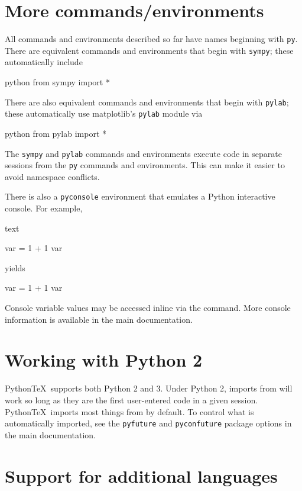 \documentclass[twocolumn]{article}
\newcommand{\pytex}{Python\TeX}
\begin{document}
{\section*{More commands/environments}

All commands and environments described so far have names beginning with \texttt{py}.  There are equivalent commands and environments that begin with \texttt{sympy}; these automatically include
\begin{pygments}{python}
from sympy import *
\end{pygments}
There are also equivalent commands and environments that begin with \texttt{pylab}; these automatically use matplotlib's \texttt{pylab} module via
\begin{pygments}{python}
from pylab import *
\end{pygments}
The \texttt{sympy} and \texttt{pylab} commands and environments execute code in separate sessions from the \texttt{py} commands and environments.  This can make it easier to avoid namespace conflicts.

There is also a \texttt{pyconsole} environment that emulates a Python interactive console.  For example,
\begin{pygments}{text}
\begin{pyconsole}
var = 1 + 1
var
\end{pyconsole}
\end{pygments}
yields
\begin{pyconsole}
var = 1 + 1
var
\end{pyconsole}
Console variable values may be accessed inline via the  command.  More console information is available in the main documentation.

\section*{Working with Python 2}
\pytex\ supports both Python 2 and 3.  Under Python 2, imports from  will work so long as they are the first user-entered code in a given session.  \pytex\ imports most things from  by default.  To control what is automatically imported, see the \texttt{pyfuture} and \texttt{pyconfuture} package options in the main documentation.


\section*{Support for additional languages}

}
\end{document}
